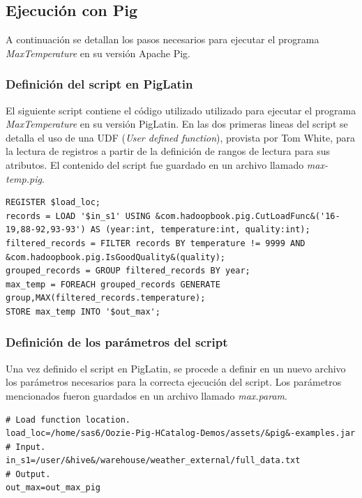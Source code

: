 \subsection{Ejecución con Pig}

A continuación se detallan los pasos necesarios para ejecutar el programa \textit{MaxTemperature} en su versión Apache Pig. \\

\subsubsection{Definición del script en PigLatin}

El siguiente script contiene el código utilizado utilizado para ejecutar el programa \textit{MaxTemperature} en su versión PigLatin. En las dos primeras lineas del script se detalla el uso de una UDF (\textit{User defined function}), provista por Tom White, para la lectura de registros a partir de la definición de rangos de lectura para sus atributos. El contenido del script fue guardado en un archivo llamado \textit{max-temp.pig}.

\begin{lstlisting}[linewidth=\columnwidth,breaklines=true]
REGISTER $load_loc;
records = LOAD '$in_s1' USING &com.hadoopbook.pig.CutLoadFunc&('16-19,88-92,93-93') AS (year:int, temperature:int, quality:int); 
filtered_records = FILTER records BY temperature != 9999 AND &com.hadoopbook.pig.IsGoodQuality&(quality);
grouped_records = GROUP filtered_records BY year;
max_temp = FOREACH grouped_records GENERATE group,MAX(filtered_records.temperature);
STORE max_temp INTO '$out_max';   
\end{lstlisting} 


\subsubsection{Definición de los parámetros del script}

Una vez definido el script en PigLatin, se procede a definir en un nuevo archivo los parámetros necesarios para la correcta ejecución del script. Los parámetros mencionados fueron guardados en un archivo llamado \textit{max.param}.

\begin{lstlisting}[linewidth=\columnwidth,breaklines=true]
# Load function location.
load_loc=/home/sas6/Oozie-Pig-HCatalog-Demos/assets/&pig&-examples.jar
# Input.
in_s1=/user/&hive&/warehouse/weather_external/full_data.txt
# Output.
out_max=out_max_pig
\end{lstlisting}

